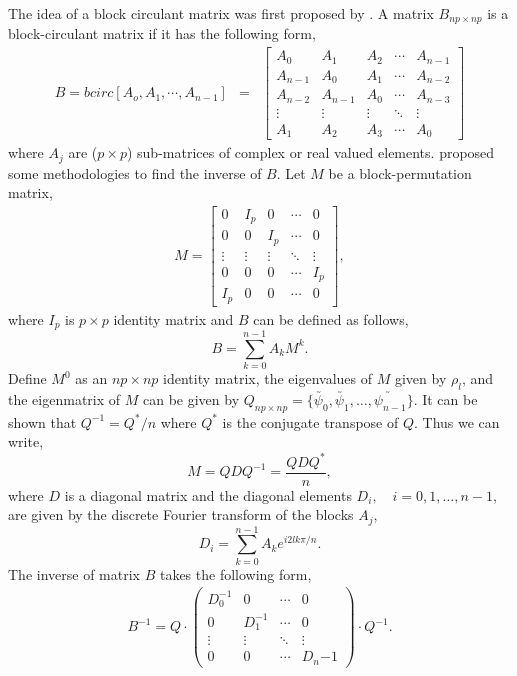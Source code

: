 The idea of a block circulant matrix was first proposed by \cite{Muir1920}. A matrix $B_{np\times np}$ is a block-circulant matrix if it has the following form,
\begin{eqnarray}
	B = bcirc[A_o, A_1,\cdots,A_{n-1}] &=& \left[
		\begin{array}{lllll}
			A_0     & A_1     & A_2    & \cdots & A_{n-1} \\
			A_{n-1} & A_0     & A_1    & \cdots & A_{n-2} \\
			A_{n-2} & A_{n-1} & A_0    & \cdots & A_{n-3} \\
			\vdots  & \vdots  & \vdots & \ddots & \vdots  \\
			A_1     & A_2     & A_3    & \cdots & A_0
		\end{array}
	\right]
\end{eqnarray}
where $A_j$ are ($p \times p$) sub-matrices of complex or real valued elements. \cite{DeMazancourt1983} proposed some methodologies to find the inverse of $B$. Let $M$ be a block-permutation matrix,
\begin{eqnarray*}
	M = \left[
		\begin{array}{lllll}
			0       & I_p     & 0      & \cdots & 0 \\
			0       & 0       & I_p    & \cdots & 0 \\
			\vdots  & \vdots  & \vdots & \ddots & \vdots  \\
			0       & 0       & 0      & \cdots & I_p \\
			I_p     & 0     & 0    & \cdots & 0
		\end{array}
	\right],
\end{eqnarray*}
where $I_p$ is $p\times p$ identity matrix and $B$ can be defined as follows,
\[
B = \sum_{k=0}^{n-1} A_k M^k.
\]
Define $M^0$ as an $np\times np$ identity matrix, the eigenvalues of $M$ given by $\rho_l$, and the eigenmatrix of $M$ can be given by $Q_{np\times np}=\{ \utilde{\psi_0}, \utilde{\psi_1},\ldots, \utilde{\psi_{n-1}} \}$. It can be shown \citep{Trapp1973} that $Q^{-1} = Q^*/n$ where $Q^*$ is the conjugate transpose of $Q$. Thus we can write,
\[
M = QDQ^{-1} = \frac{QDQ^*}{n},
\]
where $D$ is a diagonal matrix and the diagonal elements $D_i, \quad i=0,1,\ldots, n-1$, are given by the discrete Fourier transform of the blocks $A_j$,
\[
D_i = \sum_{k=0}^{n-1} A_k e^{i2lk\pi/n}.
\]
The inverse of matrix $B$ takes the following form,
\begin{eqnarray*}
	B^{-1} = Q\cdot\left(
		\begin{array}{llll}
			D_0^{-1}  & 0              & \cdots & 0 \\
			0         & D_1^{-1}       & \cdots & 0 \\
			\vdots    & \vdots         & \ddots & \vdots  \\
			0         & 0              & \cdots & D_n{-1}
		\end{array}
	\right)\cdot Q^{-1}.
\end{eqnarray*}

